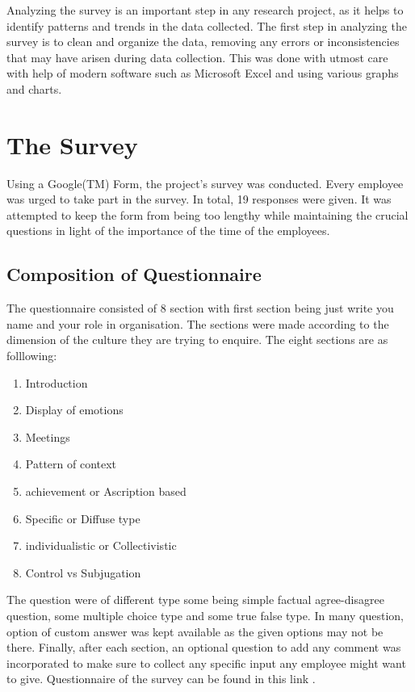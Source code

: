 \documentclass{article}
\begin{document}
Analyzing the survey is an important step in any research project, as it helps to identify patterns and trends in the data collected. The first step in analyzing the survey is to clean and organize the data, removing any errors or inconsistencies that may have arisen during data collection. This was done with utmost care with help of modern software such as Microsoft Excel and using various graphs and charts.

\section{The Survey}

Using a Google(TM) Form, the project's survey was conducted. Every employee was urged to take part in the survey. In total, 19 responses were given. It was attempted to keep the form from being too lengthy while maintaining the crucial questions in light of the importance of the time of the employees.

\subsection*{Composition of Questionnaire}

The questionnaire consisted of 8 section with first section being just write you name and your role in organisation. The sections were made according to the dimension of the culture they are trying to enquire. The eight sections are as folllowing:

\begin{enumerate}
    \item Introduction
    \item Display of emotions
    \item Meetings
    \item Pattern of context
    \item achievement or Ascription based
    \item Specific or Diffuse type
    \item individualistic or Collectivistic
    \item Control vs Subjugation
\end{enumerate}

The question were of different type some being simple factual agree-disagree question, some multiple choice type and some true false type. In many question, option of custom answer was kept available as the given options may not be there. Finally, after each section, an optional question to add any comment was incorporated to make sure to collect any specific input any employee might want to give. Questionnaire of the survey can be found in this link \cite{ref: Survey Form}.
\end{document}
